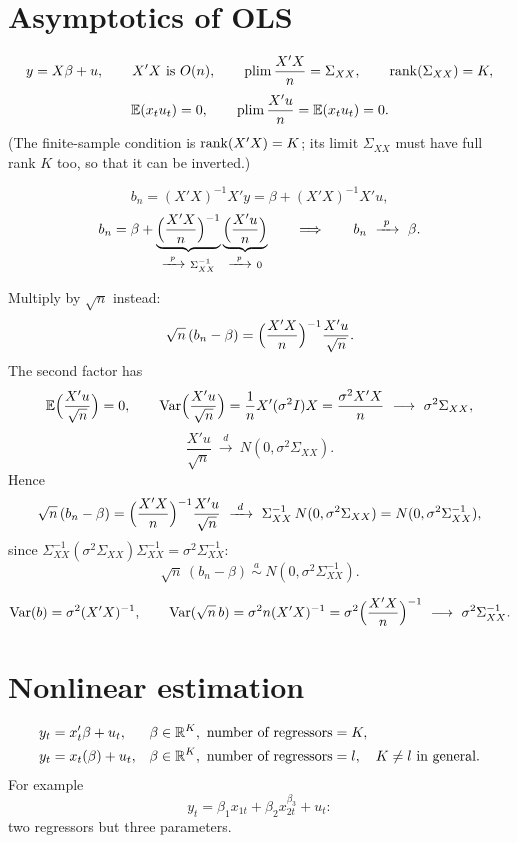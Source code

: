 \documentclass[11pt]{article}
\begin{document}
\section{Asymptotics of OLS}

\[ y = X\beta + u, \qquad X'X \text{ is } O(n), \qquad
   \operatorname*{plim}\frac{X'X}{n} = \Sigma_{XX}, \qquad \operatorname{rank}(\Sigma_{XX}) = K, \]
\[ \mathbb{E}(x_{t}u_{t}) = 0, \qquad \operatorname*{plim}\frac{X'u}{n} = \mathbb{E}(x_{t}u_{t}) = 0. \]
(The finite-sample condition is $\operatorname{rank}(X'X) = K$; its limit $\Sigma_{XX}$ must have
full rank $K$ too, so that it can be inverted.)

\[ b_{n} = (X'X)^{-1}X'y = \beta + (X'X)^{-1}X'u, \]
\[ b_{n} = \beta + \underbrace{\Bigl(\frac{X'X}{n}\Bigr)^{-1}}_{\xrightarrow{\ p\ }\ \Sigma_{XX}^{-1}}
               \underbrace{\Bigl(\frac{X'u}{n}\Bigr)}_{\xrightarrow{\ p\ }\ 0}
   \qquad\Longrightarrow\qquad b_{n} \ \xrightarrow{\ p\ }\ \beta. \]

Multiply by $\sqrt{n}$ instead:
\[ \sqrt{n}\,(b_{n} - \beta) = \Bigl(\frac{X'X}{n}\Bigr)^{-1}\frac{X'u}{\sqrt{n}}. \]
The second factor has
\[ \E\Bigl(\frac{X'u}{\sqrt{n}}\Bigr) = 0, \qquad
   \Var\Bigl(\frac{X'u}{\sqrt{n}}\Bigr) = \frac{1}{n}X'(\sigma^{2}I)X
   = \frac{\sigma^{2}X'X}{n} \ \longrightarrow\ \sigma^{2}\Sigma_{XX}, \]
\[ \frac{X'u}{\sqrt{n}} \ \xrightarrow{\ d\ }\ N(0, \sigma^{2}\Sigma_{XX}). \]
Hence
\[ \sqrt{n}\,(b_{n} - \beta) = \Bigl(\frac{X'X}{n}\Bigr)^{-1}\frac{X'u}{\sqrt{n}}
   \ \xrightarrow{\ d\ }\ \Sigma_{XX}^{-1}\,N(0, \sigma^{2}\Sigma_{XX})
   = N(0, \sigma^{2}\Sigma_{XX}^{-1}), \]
since $\Sigma_{XX}^{-1}(\sigma^{2}\Sigma_{XX})\Sigma_{XX}^{-1} = \sigma^{2}\Sigma_{XX}^{-1}$:
\[ \sqrt{n}\,(b_{n} - \beta) \ \overset{a}{\sim}\ N(0, \sigma^{2}\Sigma_{XX}^{-1}). \]

\[ \Var(b) = \sigma^{2}(X'X)^{-1}, \qquad
   \Var(\sqrt{n}\,b) = \sigma^{2}n(X'X)^{-1}
   = \sigma^{2}\Bigl(\frac{X'X}{n}\Bigr)^{-1} \ \longrightarrow\ \sigma^{2}\Sigma_{XX}^{-1}. \]


\section{Nonlinear estimation}

\begin{align*}
  y_{t} &= x_{t}'\beta + u_{t}, && \beta \in \R^{K}, \ \text{number of regressors} = K,\\
  y_{t} &= x_{t}(\beta) + u_{t}, && \beta \in \R^{K}, \ \text{number of regressors} = l, \quad K \neq l \text{ in general}.
\end{align*}
For example
\[ y_{t} = \beta_{1}x_{1t} + \beta_{2}x_{2t}^{\beta_{3}} + u_{t}: \]
two regressors but three parameters.
\end{document}

